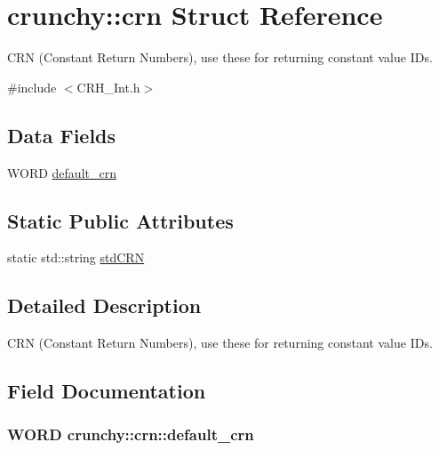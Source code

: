 \hypertarget{structcrunchy_1_1crn}{}\section{crunchy\+:\+:crn Struct Reference}
\label{structcrunchy_1_1crn}


C\+R\+N (Constant Return Numbers), use these for returning constant value I\+D\textquotesingle{}s.  




{\ttfamily \#include $<$C\+R\+H\+\_\+\+Int.\+h$>$}

\subsection*{Data Fields}
\begin{DoxyCompactItemize}
\item 
W\+O\+R\+D \hyperlink{structcrunchy_1_1crn_af6e0614d6a09fa22b503c55937e974aa}{default\+\_\+crn}
\end{DoxyCompactItemize}
\subsection*{Static Public Attributes}
\begin{DoxyCompactItemize}
\item 
static std\+::string \hyperlink{structcrunchy_1_1crn_ae5f71a10acf2431498d683fee28851db}{std\+C\+R\+N}
\end{DoxyCompactItemize}


\subsection{Detailed Description}
C\+R\+N (Constant Return Numbers), use these for returning constant value I\+D\textquotesingle{}s. 

\subsection{Field Documentation}
\hypertarget{structcrunchy_1_1crn_af6e0614d6a09fa22b503c55937e974aa}{}
\subsubsection[{default\+\_\+crn}]{\setlength{\rightskip}{0pt plus 5cm}W\+O\+R\+D crunchy\+::crn\+::default\+\_\+crn}\label{structcrunchy_1_1crn_af6e0614d6a09fa22b503c55937e974aa}
\hypertarget{structcrunchy_1_1crn_ae5f71a10acf2431498d683fee28851db}{}
